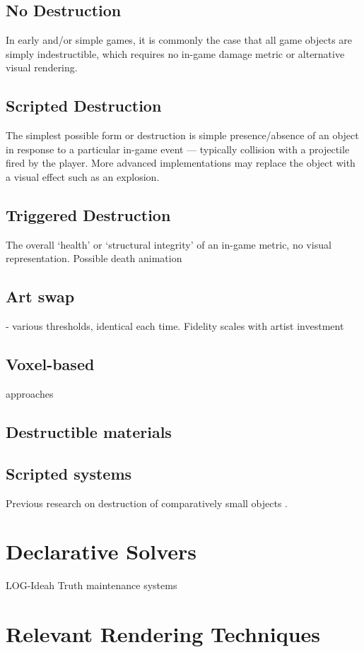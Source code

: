 \documentclass[11pt]{report}
\begin{document}
		\subsection{No Destruction}
			In early and/or simple games, it is commonly the case that all game objects are simply indestructible, which requires no in-game damage metric or alternative visual rendering.

		\subsection{Scripted Destruction}
			The simplest possible form or destruction is simple presence/absence of an object in response to a particular in-game event --- typically collision with a projectile fired by the player. More advanced implementations may replace the object with a visual effect such as an explosion.

		\subsection{Triggered Destruction}
			The overall `health' or `structural integrity' of an 
		in-game metric, no visual representation. Possible death animation

		\subsection{Art swap} - various thresholds, identical each time. Fidelity scales with artist investment
		\subsection{Voxel-based} approaches
		\subsection{Destructible materials}
		\subsection{Scripted systems}

		Previous research on destruction of comparatively small objects \cite{van2011procedural}.
	\section{Declarative Solvers}
		LOG-Ideah
		Truth maintenance systems

	\section{Relevant Rendering Techniques}
\end{document}
